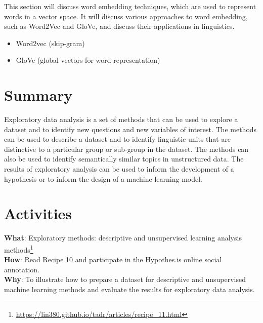 \documentclass[
  letterpaper,
]{scrbook}
\providecommand{\tightlist}{%
  \setlength{\itemsep}{0pt}\setlength{\parskip}{0pt}}\usepackage{longtable,booktabs,array}
\DeclareRobustCommand{\href}[2]{#2\footnote{\url{#1}}}
\begin{document}
This section will discuss word embedding techniques, which are used to
represent words in a vector space. It will discuss various approaches to
word embedding, such as Word2Vec and GloVe, and discuss their
applications in linguistics.

\begin{itemize}
\tightlist
\item
  Word2vec (skip-gram)
\item
  GloVe (global vectors for word representation)
\end{itemize}

\hypertarget{summary-11}{%
\section{Summary}\label{summary-11}}

Exploratory data analysis is a set of methods that can be used to
explore a dataset and to identify new questions and new variables of
interest. The methods can be used to describe a dataset and to identify
linguistic units that are distinctive to a particular group or sub-group
in the dataset. The methods can also be used to identify semantically
similar topics in unstructured data. The results of exploratory analysis
can be used to inform the development of a hypothesis or to inform the
design of a machine learning model.

\hypertarget{activities-7}{%
\section*{Activities}\label{activities-7}}


\begin{tcolorbox}[enhanced jigsaw, title=\textcolor{quarto-callout-tip-color}{\faLightbulb}\hspace{0.5em}{Recipe}, titlerule=0mm, toptitle=1mm, colbacktitle=quarto-callout-tip-color!10!white, bottomtitle=1mm, left=2mm, colframe=quarto-callout-tip-color-frame, breakable, toprule=.15mm, colback=white, opacitybacktitle=0.6, leftrule=.75mm, rightrule=.15mm, bottomrule=.15mm, arc=.35mm, coltitle=black, opacityback=0]

\textbf{What}:
\href{https://lin380.github.io/tadr/articles/recipe_11.html}{Exploratory
methods: descriptive and unsupervised learning analysis methods}\\
\textbf{How}: Read Recipe 10 and participate in the Hypothes.is online
social annotation.\\
\textbf{Why}: To illustrate how to prepare a dataset for descriptive and
unsupervised machine learning methods and evaluate the results for
exploratory data analysis.

\end{tcolorbox}
\end{document}
